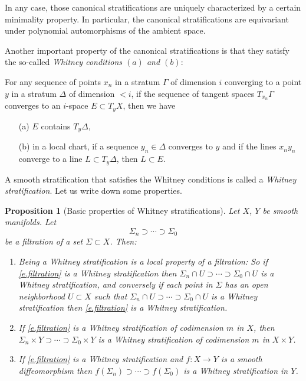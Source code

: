 \documentclass[10pt, a4paper]{amsart}
\theoremstyle{plain}
\newtheorem{prop}[lemma]{Proposition}
\theoremstyle{definition}
\theoremstyle{remark}
\theoremstyle{note}
\numberwithin{equation}{section}
\begin{document}
In any case, those canonical stratifications are uniquely characterized by a certain minimality property.
In particular, the canonical stratifications are equivariant under polynomial automorphisms of 
the ambient space. 

Another important property of the canonical stratifications 
is that they satisfy the so-called \emph{Whitney conditions $(a)$ and $(b)$}: 
\medskip

For any  sequence of points $x_n$ in a stratum $\Gamma$ of dimension $i$ converging to a point $y$ in a stratum $\Delta$ of dimension $<i$, if the sequence of tangent spaces $T_{x_n}\Gamma$ converges to an $i$-space $E\subset T_yX$, then we have
\begin{itemize}
\item[(a)] $E$ contains $T_y\Delta$,

\item[(b)] in a local chart, if a sequence $y_n\in \Delta$ converges to $y$ and if the lines $x_ny_n$ converge to a line $L\subset T_y\Delta$,  then $L\subset E$.
\end{itemize}

\medskip

A smooth stratification that satisfies the Whitney conditions is called a \emph{Whitney stratification}. Let us write down some properties.

\begin{prop}[Basic properties of Whitney stratifications]\label{p.whitney_properties} 
Let $X$, $Y$ be smooth manifolds.
Let 
\begin{equation}\label{e.filtration}
\Sigma_n \supset \cdots \supset \Sigma_0
\end{equation}
be a filtration of a set $\Sigma \subset X$.
Then:
\begin{enumerate}
\item \label{i.whitney_local}
Being a Whitney stratification is a local property of a filtration:
So if \eqref{e.filtration} is a Whitney stratification then
$\Sigma_n \cap U \supset \cdots \supset \Sigma_0 \cap U$ 
is a Whitney stratification, 
and conversely if each point in $\Sigma$ has an open neighborhood $U \subset X$ such that
$\Sigma_n \cap U \supset \cdots \supset \Sigma_0 \cap U$ is a Whitney stratification
then \eqref{e.filtration} is a Whitney stratification.
\item \label{i.whitney_product}
If  \eqref{e.filtration} is a Whitney stratification of codimension $m$ in $X$,
then $\Sigma_n \times Y \supset \cdots \supset \Sigma_0 \times Y$  
is a Whitney stratification of codimension $m$ in $X \times Y$.
\item \label{i.whitney_invariance}
If  \eqref{e.filtration} is a Whitney stratification 
and $f \colon X \to Y$ is a smooth diffeomorphism 
then $f(\Sigma_n) \supset \cdots \supset f(\Sigma_0)$ 
is a Whitney stratification in $Y$. 
\end{enumerate}
\end{prop}
\end{document}
